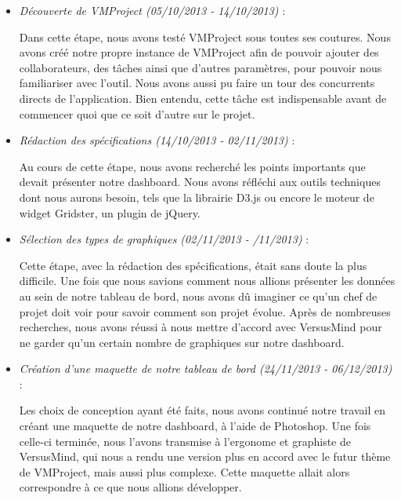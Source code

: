 \documentclass[12pt]{report}
\begin{document}
\begin{itemize}

\item \emph{Découverte de VMProject (05/10/2013 - 14/10/2013)} :

Dans cette étape, nous avons testé VMProject sous toutes ses coutures. Nous avons créé notre propre instance de VMProject afin de pouvoir ajouter des collaborateurs, des tâches ainsi que d’autres paramètres, pour pouvoir nous familiariser avec l’outil. Nous avons aussi pu faire un tour des concurrents directs de l'application. Bien entendu, cette tâche est indispensable avant de commencer quoi que ce soit d’autre sur le projet.\\

\item \emph{Rédaction des spécifications (14/10/2013 - 02/11/2013)} :

Au cours de cette étape, nous avons recherché les points importants que devait présenter notre dashboard. Nous avons réfléchi aux outils techniques dont nous aurons besoin, tels que la librairie D3.js ou encore le moteur de widget Gridster, un plugin de jQuery.\\

\item \emph{Sélection des types de graphiques (02/11/2013 - /11/2013)} :

Cette étape, avec la rédaction des spécifications, était sans doute la plus difficile. Une fois que nous savions comment nous allions présenter les données au sein de notre tableau de bord, nous avons dû imaginer ce qu’un chef de projet doit voir pour savoir comment son projet évolue. Après de nombreuses recherches, nous avons réussi à nous mettre d’accord avec VersusMind pour ne garder qu’un certain nombre de graphiques sur notre dashboard.\\

\item \emph{Création d’une maquette de notre tableau de bord (24/11/2013 - 06/12/2013)} :

Les choix de conception ayant été faits, nous avons continué notre travail en créant une maquette de notre dashboard, à l’aide de Photoshop. Une fois celle-ci terminée, nous l’avons transmise à l’ergonome et graphiste de VersusMind, qui nous a rendu une version plus en accord avec le futur thème de VMProject, mais aussi plus complexe. Cette maquette allait alors correspondre à ce que nous allions développer.\\


\end{itemize}
\end{document}
